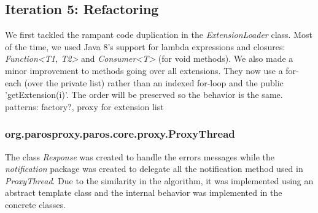 \subsection{Iteration 5: Refactoring}
We first tackled the rampant code duplication in  the \textit{ExtensionLoader} class. Most of the time, we used Java 8's support for lambda expressions and closures: \textit{Function<T1, T2>} and \textit{Consumer<T>} (for void methods).
We also made a minor improvement to methods going over all extensions. They now use a for-each (over the private list) rather than an indexed for-loop and the public 'getExtension(i)'. The order will be preserved so the behavior is the same.
patterns: factory?, proxy for extension list
\subsubsection{org.parosproxy.paros.core.proxy.ProxyThread}

The class \textit{Response} was created to handle the errors messages while the \textit{notification} package was created to delegate all the notification method used in \textit{ProxyThread}. Due to the similarity in the algorithm, it was implemented using an abstract template class and the internal behavior was implemented in the concrete classes.
